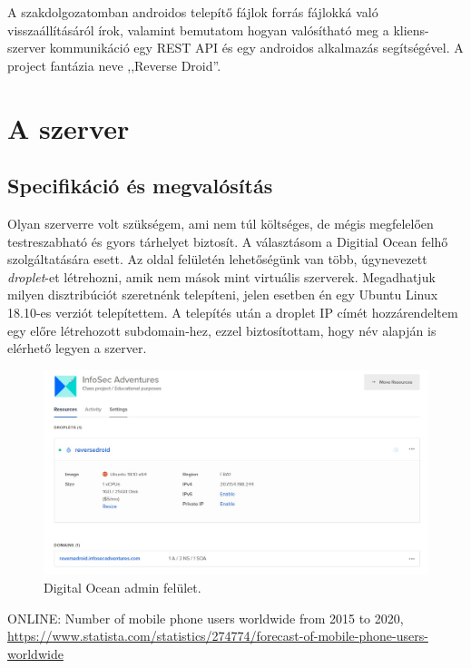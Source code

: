 \documentclass{thesis-ekf}             %
\theoremstyle{definition}
\theoremstyle{remark}
\begin{document}
A szakdolgozatomban androidos telepítő  fájlok forrás fájlokká való visszaállításáról írok, valamint bemutatom hogyan valósítható meg a kliens-szerver kommunikáció egy REST API és egy androidos alkalmazás segítségével. A project fantázia neve ,,Reverse Droid''.


\chapter{A szerver }\label{szerver}
\section{Specifikáció és megvalósítás}

Olyan szerverre volt szükségem, ami nem túl költséges, de mégis megfelelően testreszabható és gyors tárhelyet biztosít. A választásom a Digitial Ocean felhő szolgáltatására esett. Az oldal felületén lehetőségünk van több, úgynevezett \emph{droplet}-et létrehozni, amik nem mások mint virtuális szerverek. Megadhatjuk milyen disztribúciót szeretnénk telepíteni, jelen esetben én egy Ubuntu Linux 18.10-es verziót telepítettem. A telepítés után a droplet IP címét hozzárendeltem egy előre létrehozott subdomain-hez, ezzel biztosítottam, hogy név alapján is elérhető legyen a szerver.

\begin{figure}[!h]
	\centering
	\includegraphics[width=15cm]{kepek/digitalocean}
	\caption{Digital Ocean admin felület.}
	\label{digitalocean}
\end{figure}

\begin{thebibliography}{1}
 \textsc{ONLINE}: Number of mobile phone users worldwide from 2015 to 2020, \url{https://www.statista.com/statistics/274774/forecast-of-mobile-phone-users-worldwide}
\end{thebibliography}
\end{document}
